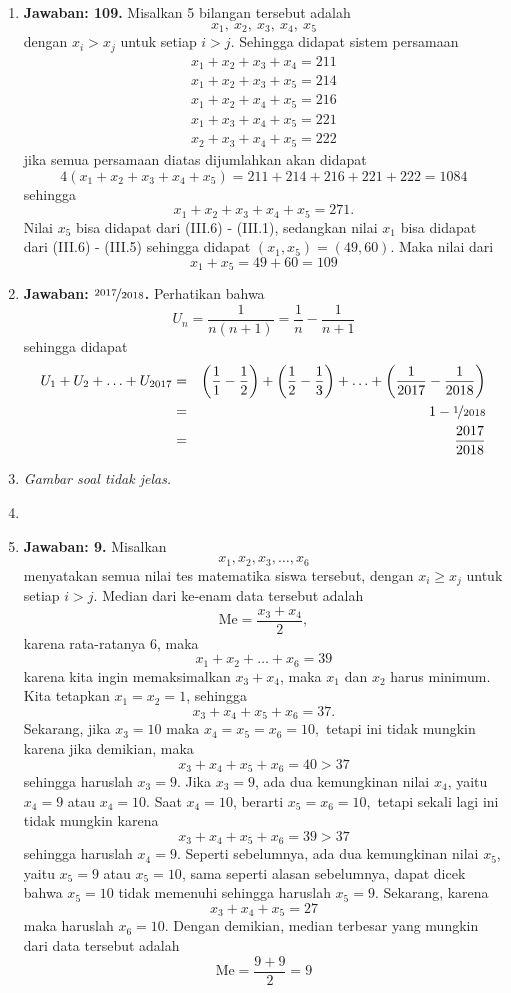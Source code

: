 \begin{enumerate}
\item \textbf{Jawaban: 109.} Misalkan 5 bilangan tersebut adalah $$x_1,\ x_2,\ x_3,\ x_4,\ x_5$$ dengan $x_i > x_j$ untuk setiap $i>j$. Sehingga didapat sistem persamaan
	\setcounter{equation}{0}\begin{gather}
	x_1 + x_2 + x_3 + x_4 = 211\\
	x_1 + x_2 + x_3 + x_5 = 214\\
	x_1 + x_2 + x_4 + x_5 = 216\\
	x_1 + x_3 + x_4 + x_5 = 221\\
	x_2 + x_3 + x_4 + x_5 = 222
	\end{gather}
jika semua persamaan diatas dijumlahkan akan didapat $$4(x_1 + x_2 + x_3 + x_4 + x_5) = 211 + 214 + 216 + 221 + 222 = 1084$$sehingga \begin{equation}x_1+x_2+x_3+x_4+x_5 = 271.\end{equation} Nilai $x_5$ bisa didapat dari (III.6) - (III.1), sedangkan nilai $x_1$ bisa didapat dari (III.6) - (III.5) sehingga didapat $(x_1, x_5) = (49, 60)$. Maka nilai dari $$x_1 + x_5 = 49 + 60 = 109$$

\item \textbf{Jawaban: $\nicefrac{2017}{2018}$.} Perhatikan bahwa $$U_n = \frac{1}{n(n+1)} = \frac{1}{n} - \frac{1}{n+1}$$sehingga didapat
\begin{eqnarray*}
U_1 +U_2 +\ldots +U_{2017} &=& \left(\frac{1}{1} - \frac{1}{2}\right) + \left(\frac{1}{2} - \frac{1}{3}\right) + \ldots + \left(\frac{1}{2017}-\frac{1}{2018}\right)\\
				      &=& 1-\nicefrac{1}{2018}\\
				      &=& \frac{2017}{2018}
\end{eqnarray*}

\item \emph{Gambar soal tidak jelas.}

\item

\item \textbf{Jawaban: 9.} Misalkan $$x_1,x_2,x_3,\ldots,x_6$$ menyatakan semua nilai tes matematika siswa tersebut, dengan $x_i\geq x_j$ untuk setiap $i>j$. Median dari ke-enam data tersebut adalah $$\text{Me} = \frac{x_3+x_4}{2},$$ karena rata-ratanya 6, maka $$x_1 + x_2 + \ldots +x_6 = 39$$karena kita ingin memaksimalkan $x_3+x_4$, maka $x_1$ dan $x_2$ harus minimum. Kita tetapkan $x_1 = x_2 = 1$, sehingga $$x_3 + x_4+x_5+x_6 = 37.$$Sekarang, jika $x_3 = 10$ maka $x_4=x_5=x_6 =10,$ tetapi ini tidak mungkin karena jika demikian, maka$$x_3+x_4+x_5+x_6 = 40 > 37$$ sehingga haruslah $x_3 = 9.$ Jika $x_3 = 9$, ada dua kemungkinan nilai $x_4$, yaitu $x_4 = 9$ atau $x_4 = 10$. Saat $x_4 = 10$, berarti $x_5 = x_6 = 10,$ tetapi sekali lagi ini tidak mungkin karena $$x_3+x_4+x_5+x_6 = 39 > 37$$sehingga haruslah $x_4 = 9.$ Seperti sebelumnya, ada dua kemungkinan nilai $x_5$, yaitu $x_5 = 9$ atau $x_5 = 10$, sama seperti alasan sebelumnya, dapat dicek bahwa $x_5 = 10$ tidak memenuhi sehingga haruslah $x_5 = 9$. Sekarang, karena $$x_3 + x_4 + x_5 = 27$$maka haruslah $x_6 = 10.$ Dengan demikian, median terbesar yang mungkin dari data tersebut adalah $$\text{Me} = \frac{9+9}{2} = 9$$

\end{enumerate}
